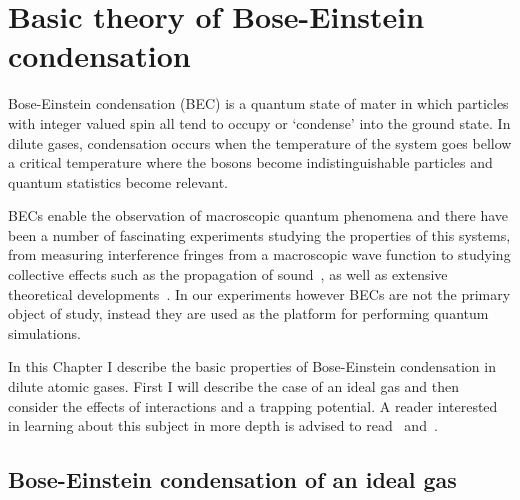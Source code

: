 
\renewcommand{\thechapter}{2}

\chapter{Basic theory of Bose-Einstein condensation}

Bose-Einstein condensation (BEC) is a quantum state of mater in which particles with integer valued spin all tend to occupy or `condense' into the ground state. In dilute gases, condensation occurs when the temperature of the system goes bellow a critical temperature where the bosons become indistinguishable particles and quantum statistics become relevant. 

BECs enable the observation of macroscopic quantum phenomena and there have been a number of fascinating experiments studying the properties of this systems, from measuring interference fringes from a macroscopic wave function to studying collective effects such as the propagation of sound~\cite{ketterle_w._making_1999}, as well as extensive theoretical developments~\cite{dalfovo_theory_1999}. In our experiments however BECs are not the primary object of study, instead they are used as the platform for performing quantum simulations. 

In this Chapter I describe the basic properties of Bose-Einstein condensation in dilute atomic gases. First I will describe the case of an ideal gas and then consider the effects of interactions and a trapping potential. A reader interested in learning about this subject in more depth is advised to read~\cite{Pethick} and~\cite{noauthor_bose-einstein_2003}.

\section{Bose-Einstein condensation of an ideal gas}

